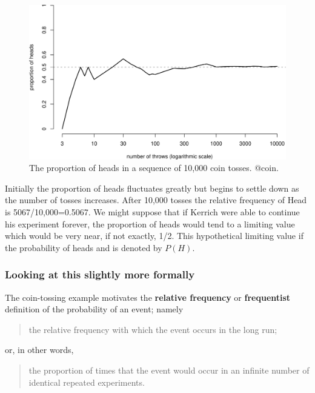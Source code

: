 \documentclass[
  11pt,
  british,
  openany, a4paper]{book}
\begin{document}
\begin{figure}

{\centering \includegraphics[width=0.75\linewidth]{images/coin} 

}

\caption{The proportion of heads in a sequence of 10,000 coin tosses. @coin.}\label{fig:coin}
\end{figure}

Initially the proportion of heads fluctuates greatly but begins to settle down as the number of tosses increases. After 10,000 tosses the relative frequency of Head is 5067/10,000=0.5067. We might suppose that if Kerrich were able to continue his experiment forever, the proportion of heads would tend to a limiting value which would be very near, if not exactly, 1/2. This hypothetical limiting value if the probability of heads and is denoted by \(P(H)\).

\hypertarget{looking-at-this-slightly-more-formally}{%
\subsubsection*{Looking at this slightly more formally}\label{looking-at-this-slightly-more-formally}}

The coin-tossing example motivates the \textbf{relative frequency} or \textbf{frequentist} definition of the probability of an event; namely

\begin{quote}
the relative frequency with which the event occurs in the long run;
\end{quote}

or, in other words,

\begin{quote}
the proportion of times that the event would occur in an infinite number of identical repeated experiments.
\end{quote}
\end{document}
